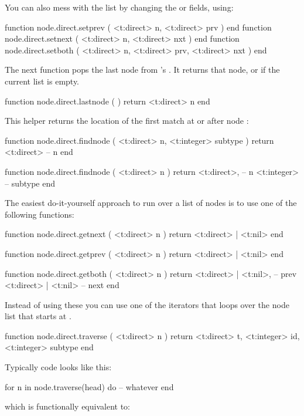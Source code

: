 You can also mess with the list by changing the  or  fields, using:

\starttyping[option=LUA]
function node.direct.setprev ( <t:direct> n, <t:direct> prv                 ) end
function node.direct.setnext ( <t:direct> n, <t:direct> nxt                 ) end
function node.direct.setboth ( <t:direct> n, <t:direct> prv, <t:direct> nxt ) end
\stoptyping

The next function pops the last node from \TEX's . It returns
that node, or  if the current list is empty.

\starttyping[option=LUA]
function node.direct.lastnode ( )
    return <t:direct> n
end
\stoptyping

This helper returns the location of the first match at or after node :

\starttyping[option=LUA]
function node.direct.findnode ( <t:direct> n, <t:integer> subtype )
    return <t:direct> -- n
end

function node.direct.findnode ( <t:direct> n )
    return
        <t:direct>, -- n
        <t:integer> -- subtype
end
\stoptyping

\stopsubsection

\startsubsection[title={Traversing}]

The easiest do-it-yourself approach to run over a list of nodes is to use one of
the following functions:

\starttyping[option=LUA]
function node.direct.getnext ( <t:direct> n )
    return <t:direct> | <t:nil>
end

function node.direct.getprev ( <t:direct> n )
    return <t:direct> | <t:nil>
end

function node.direct.getboth ( <t:direct> n )
    return
        <t:direct> | <t:nil>, -- prev
        <t:direct> | <t:nil>  -- next
end
\stoptyping

Instead of using these you can use one of the iterators that loops over the node
list that starts at .

\starttyping[option=LUA]
function node.direct.traverse ( <t:direct> n )
    return
        <t:direct>  t,
        <t:integer> id,
        <t:integer> subtype
end
\stoptyping

Typically code looks like this:

\starttyping[option=LUA]
for n in node.traverse(head) do
    -- whatever
end
\stoptyping

which is functionally equivalent to:

